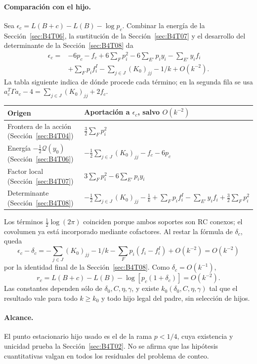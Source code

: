 \paragraph{Comparación con el hijo.}
Sea $\epsilon_c=L(B+c)-L(B)-\log p_c$.
Combinar la energía de la Sección~\ref{sec:B4T06}, la sustitución de la Sección~\ref{sec:B4T07} y
el desarrollo del determinante de la Sección~\ref{sec:B4T08} da
\[
 \begin{aligned}
 \epsilon_c={}&-6p_c-f_c+6\sum_Fp_i^2-6\sum_{E'}p_iy_i
 -\sum_{E'}y_i f_i\\
 &+\sum_Fp_i f_i^I-\sum_{j\in J}(K_0)_{jj}-1/k+O(k^{-2}).
 \end{aligned}
\]
La tabla siguiente indica de dónde procede cada término; en la segunda fila se usa
$a_c^T\Gamma a_c-4=\sum_{j\in J}(K_0)_{jj}+2f_c$.
\begin{center}
\renewcommand{\arraystretch}{1.3}
\begin{tabular}{@{}ll@{}}
\toprule
Origen & Aportación a $\epsilon_c$, salvo $O(k^{-2})$\\
\midrule
Frontera de la acción (Sección~\ref{sec:B4T04}) & $\tfrac32\sum_Fp_i^2$\\
Energía $-\tfrac12\mathcal Q(y_0)$ (Sección~\ref{sec:B4T06}) &
 $-\tfrac12\sum_{j\in J}(K_0)_{jj}-f_c-6p_c$\\
Factor local (Sección~\ref{sec:B4T07}) & $3\sum_Fp_i^2-6\sum_{E'}p_iy_i$\\
Determinante (Sección~\ref{sec:B4T08}) &
 $-\tfrac12\sum_{j\in J}(K_0)_{jj}-\tfrac1k+\sum_Fp_if_i^I-\sum_{E'}y_if_i+\tfrac32\sum_Fp_i^2$\\
\bottomrule
\end{tabular}
\end{center}
Los términos $\tfrac12\log(2\pi)$ coinciden porque ambos soportes
son RC conexos; el covolumen ya está incorporado mediante cofactores.
Al restar la fórmula de $\delta_c$, queda
\[
 \epsilon_c-\delta_c=-\sum_{j\in J}(K_0)_{jj}-1/k
                    -\sum_Fp_i(f_i-f_i^I)+O(k^{-2})=O(k^{-2})
\]
por la identidad final de la Sección~\ref{sec:B4T08}.
Como $\delta_c=O(k^{-1})$,
\[
 \boxed{r_c=L(B+c)-L(B)-\log[p_c(1+\delta_c)]=O(k^{-2}).}
\]
Las constantes dependen sólo de $\delta_0,C,\eta,\gamma$, y existe
$k_0(\delta_0,C,\eta,\gamma)$ tal que el resultado vale para todo
$k\ge k_0$ y todo hijo legal del padre, sin selección de hijos.

\paragraph{Alcance.}
El punto estacionario hijo usado es el de la rama $p<1/4$, cuya existencia y unicidad
prueba la Sección~\ref{sec:B4T02}. No se afirma que las hipótesis cuantitativas valgan en todos
los residuales del problema de conteo.
